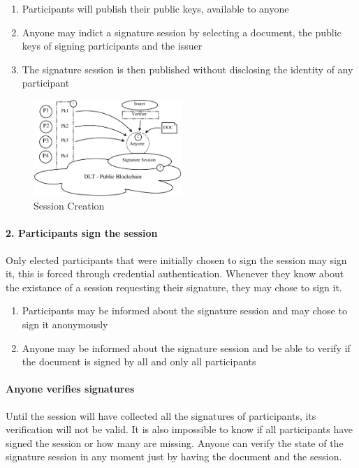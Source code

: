 \documentclass[twocolumn]{article}
\begin{document}
\begin{enumerate}
  \item Participants will publish their public keys, available to anyone 
  \item Anyone may indict a signature session by selecting a document, the public keys of signing participants and the issuer
  \item The signature session is then published without disclosing the identity of any participant
\end{enumerate}

\begin{figure}
  \caption{Session Creation}
  \label{fig:create_session}
  \centering
  \includegraphics[width=0.5\textwidth]{create_session.eps}
\end{figure}

\paragraph*{2. Participants sign the session}

Only elected participants that were initially chosen to sign the session may sign it, this is forced through credential authentication. Whenever they know about the existance of a session requesting their signature, they may chose to sign it.

\begin{enumerate}
  \item Participants may be informed about the signature session and may chose to sign it anonymously 
  \item Anyone may be informed about the signature session and be able to verify if the document is signed by all and only all participants
\end{enumerate}

\paragraph*{Anyone verifies signatures}

Until the session will have collected all the signatures of participants, its verification will not be valid. It is also impossible to know if all participants have signed the session or how many are missing. Anyone can verify the state of the signature session in any moment just by having the document and the session.  
\end{document}
